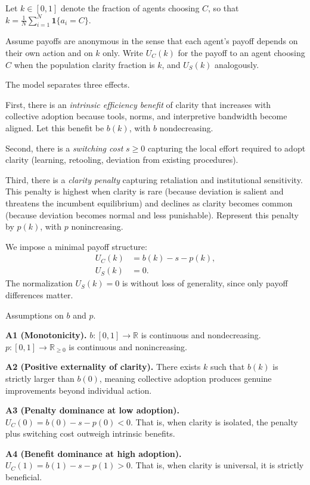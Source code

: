 \documentclass[11pt]{article}
\begin{document}
Let \(k \in [0,1]\) denote the fraction of agents choosing \(C\), so that \(k = \frac{1}{N}\sum_{i=1}^N \mathbf{1}\{a_i=C\}\).

Assume payoffs are anonymous in the sense that each agent's payoff depends on their own action and on \(k\) only. Write \(U_C(k)\) for the payoff to an agent choosing \(C\) when the population clarity fraction is \(k\), and \(U_S(k)\) analogously.

The model separates three effects.

First, there is an \emph{intrinsic efficiency benefit} of clarity that increases with collective adoption because tools, norms, and interpretive bandwidth become aligned. Let this benefit be \(b(k)\), with \(b\) nondecreasing.

Second, there is a \emph{switching cost} \(s \ge 0\) capturing the local effort required to adopt clarity (learning, retooling, deviation from existing procedures).

Third, there is a \emph{clarity penalty} capturing retaliation and institutional sensitivity. This penalty is highest when clarity is rare (because deviation is salient and threatens the incumbent equilibrium) and declines as clarity becomes common (because deviation becomes normal and less punishable). Represent this penalty by \(p(k)\), with \(p\) nonincreasing.

We impose a minimal payoff structure:
\begin{align}
U_C(k) &= b(k) - s - p(k), \label{eq:UC} \\
U_S(k) &= 0. \label{eq:US}
\end{align}
The normalization \(U_S(k)=0\) is without loss of generality, since only payoff differences matter.

Assumptions on \(b\) and \(p\).

\textbf{A1 (Monotonicity).} \(b:[0,1]\to\mathbb{R}\) is continuous and nondecreasing. \(p:[0,1]\to\mathbb{R}_{\ge 0}\) is continuous and nonincreasing.

\textbf{A2 (Positive externality of clarity).} There exists \(k\) such that \(b(k)\) is strictly larger than \(b(0)\), meaning collective adoption produces genuine improvements beyond individual action.

\textbf{A3 (Penalty dominance at low adoption).} \(U_C(0) = b(0)-s-p(0) < 0\). That is, when clarity is isolated, the penalty plus switching cost outweigh intrinsic benefits.

\textbf{A4 (Benefit dominance at high adoption).} \(U_C(1) = b(1)-s-p(1) > 0\). That is, when clarity is universal, it is strictly beneficial.
\end{document}
